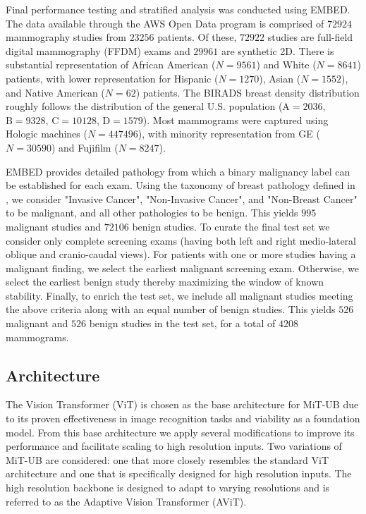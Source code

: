 \documentclass[12pt]{article}
\begin{document}
Final performance testing and stratified analysis was conducted using EMBED. The data available through the AWS Open Data program is comprised of $72924$ mammography studies from $23256$ patients. Of these, $72922$ studies are  full-field digital mammography (FFDM) exams and $29961$ are synthetic 2D.
There is substantial representation of African American ($N=9561$) and White ($N=8641$) patients, with lower representation for Hispanic ($N=1270$), Asian ($N=1552$), and Native American ($N=62$) patients. The BIRADS breast density distribution roughly follows the distribution of the general U.S. population ($\mathrm{A}=2036$, $\mathrm{B}=9328$, $\mathrm{C}=10128$, $\mathrm{D}=1579$). Most mammograms were captured using Hologic machines ($N=447496$), with minority representation from GE ($N=30590$) and Fujifilm ($N=8247$).

EMBED provides detailed pathology from which a binary malignancy label can be established for each exam. Using the taxonomy
of breast pathology defined in \cite{embed2023}, we consider "Invasive Cancer", "Non-Invasive Cancer", and "Non-Breast Cancer" to be malignant, and all other pathologies to be benign. This yields $995$ malignant studies and $72106$ benign studies.
To curate the final test set we consider only complete screening exams (having both left and right medio-lateral oblique and cranio-caudal views). For patients with one or more studies having a malignant finding, we select the earliest malignant screening exam.
Otherwise, we select the earliest benign study thereby maximizing the window of known stability. 
Finally, to enrich the test set, we include all malignant studies meeting the above criteria along with an equal number of benign studies. 
This yields $526$ malignant and $526$ benign studies in the test set, for a total of $4208$ mammograms.

\subsection{Architecture}

The Vision Transformer (ViT) \cite{dosovitskiy2020vit} is chosen as the base architecture for MiT-UB due to its proven effectiveness in image recognition tasks and viability as a foundation model. From this base architecture we apply several
modifications to improve its performance and facilitate scaling to high resolution inputs. Two variations of MiT-UB are
considered: one that more closely resembles the standard ViT architecture and one that is specifically designed for high resolution inputs. The high resolution backbone is designed to adapt to varying resolutions
and is referred to as the Adaptive Vision Transformer (AViT).
\end{document}

